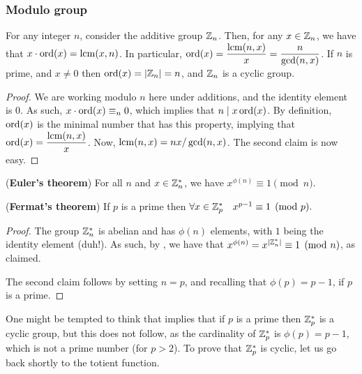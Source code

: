 \subsubsection{Modulo group}

\begin{lemma}
    For any integer $n$, consider the additive group $\mathbb{Z}_n$. Then,
    for any $x \in \mathbb{Z}_n$, we have that $x \cdot \ordX{x} =
    \lcm(x,n)$.  In particular, $\ds \ordX{x} = \frac{\lcm(n,x)}{x} =
    \frac{n}{\gcd(n,x)}$.  If $n$ is prime, and $x \neq 0$ then
    $\ordX{x} = \cardin{\ZZ_n} = n$, and $\mathbb{Z}_n$ is a cyclic group.
\end{lemma}

\begin{proof}
    We are working modulo $n$ here under additions, and the identity
    element is $0$. As such, $x \cdot \ordX{x} \equiv_n 0$, which
    implies that $n \divides x \ordX{x}$. By definition, $\ordX{x}$ is
    the minimal number that has this property, implying that $\ds
    \ordX{x} = \frac{\lcm(n,x)}{x}$. Now, $\mathop{\mathrm{lcm}}(n,x) = nx /
    \gcd(n,x)$. The second claim is now easy.
\end{proof}




\begin{theorem}
    (\textbf{Euler's theorem}) For all $n$ and $x \in \mathbb{Z}_n^*$, we
    have
    \begin{math}
        x^{\phi(n)} \equiv 1 \pmod{n}.
    \end{math}

    (\textbf{Fermat's theorem}) If $p$ is a prime then
    \begin{math}
        \forall x \in \mathbb{Z}_p^* \quad x^{p-1} \equiv 1 \pmod{p}.
    \end{math}
\end{theorem}

\begin{proof}
    The group $\mathbb{Z}_n^*$ is abelian and has $\phi(n)$ elements, with
    $1$ being the identity element (duh!). As such, by
    , we have that $x^{\phi(n)} =
    x^{\left| {\mathbb{Z}_n^*} \right|} \equiv 1 \pmod{n}$, as claimed.

    The second claim follows by setting $n=p$, and recalling that
    $\phi(p) = p-1$, if $p$ is a prime.
\end{proof}


One might be tempted to think that 
implies that if $p$ is a prime then $\mathbb{Z}_p^*$ is a cyclic group, but
this does not follow, as the cardinality of $\mathbb{Z}_p^*$ is $\phi(p) =
p-1$, which is not a prime number (for $p >2$).  To prove that
$\mathbb{Z}_p^*$ is cyclic, let us go back shortly to the totient function.

